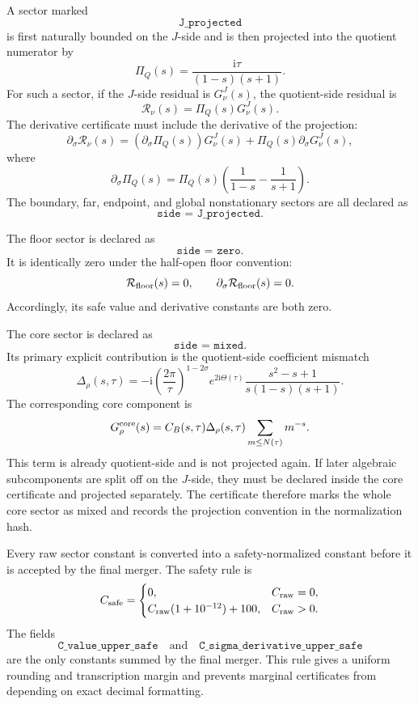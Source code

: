 \documentclass[11pt]{article}
\newcommand{\ii}{\mathrm{i}}
\newcommand{\s}{s}
\newcommand{\sig}{\sigma}
\newcommand{\tauh}{\tau}
\newcommand{\Rfloor}{\mathcal R_{\rm floor}}
\newcommand{\PiQ}{\Pi_Q}
\newcommand{\JSON}[1]{\texttt{#1}}
\newcommand{\Jproj}{\texttt{J\_projected}}
\begin{document}
A sector marked
\[
        \Jproj
\]
is first naturally bounded on the \(J\)-side and is then projected into the
quotient numerator by
\[
        \PiQ(\s)
        =
        \frac{\ii\tauh}{(1-\s)(\s+1)}.
\]
For such a sector, if the \(J\)-side residual is \(G_\nu^{J}(\s)\), the
quotient-side residual is
\[
        \mathcal R_\nu(\s)
        =
        \PiQ(\s)G_\nu^{J}(\s).
\]
The derivative certificate must include the derivative of the projection:
\[
        \partial_\sig \mathcal R_\nu(\s)
        =
        \left(\partial_\sig \PiQ(\s)\right)G_\nu^{J}(\s)
        +
        \PiQ(\s)\partial_\sig G_\nu^{J}(\s),
\]
where
\[
        \partial_\sig\PiQ(\s)
        =
        \PiQ(\s)
        \left(
            \frac{1}{1-\s}
            -
            \frac{1}{\s+1}
        \right).
\]
The boundary, far, endpoint, and global nonstationary sectors are all declared
as
\[
        \JSON{side = J\_projected}.
\]

The floor sector is declared as
\[
        \JSON{side = zero}.
\]
It is identically zero under the half-open floor convention:
\[
        \Rfloor(\s)=0,
        \qquad
        \partial_\sig\Rfloor(\s)=0.
\]
Accordingly, its safe value and derivative constants are both zero.

The core sector is declared as
\[
        \JSON{side = mixed}.
\]
Its primary explicit contribution is the quotient-side coefficient mismatch
\[
        \Delta_\rho(\s,\tauh)
        =
        -\ii
        \left(\frac{2\pi}{\tauh}\right)^{1-2\sig}
        e^{2\ii\Theta(\tauh)}
        \frac{\s^2-\s+1}{\s(1-\s)(\s+1)}.
\]
The corresponding core component is
\[
        G_{\rho}^{\rm core}(\s)
        =
        C_B(\s,\tauh)\Delta_\rho(\s,\tauh)
        \sum_{m\le N(\tauh)} m^{-\s}.
\]
This term is already quotient-side and is not projected again.  If later
algebraic subcomponents are split off on the \(J\)-side, they must be declared
inside the core certificate and projected separately.  The certificate therefore
marks the whole core sector as mixed and records the projection convention in
the normalization hash.

Every raw sector constant is converted into a safety-normalized constant before
it is accepted by the final merger.  The safety rule is
\[
        C_{\rm safe}
        =
        \begin{cases}
        0, & C_{\rm raw}=0,\\
        C_{\rm raw}(1+10^{-12})+100, & C_{\rm raw}>0.
        \end{cases}
\]
The fields
\[
        \JSON{C\_value\_upper\_safe}
        \quad\text{and}\quad
        \JSON{C\_sigma\_derivative\_upper\_safe}
\]
are the only constants summed by the final merger.  This rule gives a uniform
rounding and transcription margin and prevents marginal certificates from
depending on exact decimal formatting.
\end{document}
